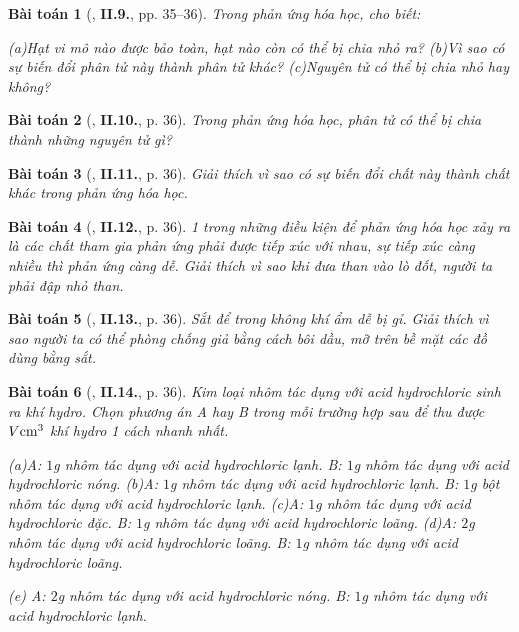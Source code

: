 \documentclass{article}
\numberwithin{equation}{section}
\newtheorem{baitoan}{Bài toán}
\begin{document}
\begin{baitoan}[\cite{Truong_BTNC_Hoa_Hoc_8_2022}, \textbf{II.9.}, pp. 35--36]
	Trong phản ứng hóa học, cho biết:
	
		(a)Hạt vi mô nào được bảo toàn, hạt nào còn có thể bị chia nhỏ ra?
		(b)Vì sao có sự biến đổi phân tử này thành phân tử khác?
		(c)Nguyên tử có thể bị chia nhỏ hay không?
	
\end{baitoan}

\begin{baitoan}[\cite{Truong_BTNC_Hoa_Hoc_8_2022}, \textbf{II.10.}, p. 36]
	Trong phản ứng hóa học, phân tử \emph{} có thể bị chia thành những nguyên tử gì?
\end{baitoan}

\begin{baitoan}[\cite{Truong_BTNC_Hoa_Hoc_8_2022}, \textbf{II.11.}, p. 36]
	Giải thích vì sao có sự biến đổi chất này thành chất khác trong phản ứng hóa học.
\end{baitoan}

\begin{baitoan}[\cite{Truong_BTNC_Hoa_Hoc_8_2022}, \textbf{II.12.}, p. 36]
	1 trong những điều kiện để phản ứng hóa học xảy ra là các chất tham gia phản ứng phải được tiếp xúc với nhau, sự tiếp xúc càng nhiều thì phản ứng càng dễ. Giải thích vì sao khi đưa than vào lò đốt, người ta phải đập nhỏ than.
\end{baitoan}

\begin{baitoan}[\cite{Truong_BTNC_Hoa_Hoc_8_2022}, \textbf{II.13.}, p. 36]
	Sắt để trong không khí ẩm dễ bị gỉ. Giải thích vì sao người ta có thể phòng chống giả bằng cách bôi dầu, mỡ trên bề mặt các đồ dùng bằng sắt.
\end{baitoan}

\begin{baitoan}[\cite{Truong_BTNC_Hoa_Hoc_8_2022}, \textbf{II.14.}, p. 36]
	Kim loại nhôm tác dụng với acid hydrochloric sinh ra khí hydro. Chọn phương án A hay B trong mỗi trường hợp sau để thu được $V{\rm cm}^3$ khí hydro 1 cách nhanh nhất.
	
		(a)A: $1$\emph{g} nhôm tác dụng với acid hydrochloric lạnh. B: $1$\emph{g} nhôm tác dụng với acid hydrochloric nóng.
		(b)A: $1$\emph{g} nhôm tác dụng với acid hydrochloric lạnh. B: $1$\emph{g} bột nhôm tác dụng với acid hydrochloric lạnh.
		(c)A: $1$\emph{g} nhôm tác dụng với acid hydrochloric đặc. B: $1$\emph{g} nhôm tác dụng với acid hydrochloric loãng.
		(d)A: $2$\emph{g} nhôm tác dụng với acid hydrochloric loãng. B: $1$\emph{g} nhôm tác dụng với acid hydrochloric loãng.
		\item[(e)] A: $2$\emph{g} nhôm tác dụng với acid hydrochloric nóng. B: $1$\emph{g} nhôm tác dụng với acid hydrochloric lạnh.
	
\end{baitoan}
\end{document}
